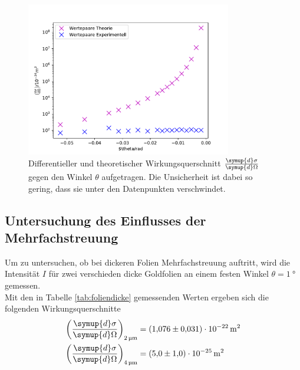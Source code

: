 \begin{figure}
    \centering
    \includegraphics[width=0.8\textwidth]{data/plots/Rutherford.pdf}
    \caption{Differentieller und theoretischer Wirkungsquerschnitt $\frac{\symup{d}\sigma}{\symup{d}\Omega}$ gegen den Winkel $\theta$ aufgetragen. Die Unsicherheit ist dabei so gering, dass sie unter den Datenpunkten verschwindet.}
    \label{fig:ruther}
\end{figure}

\FloatBarrier

\subsection{Untersuchung des Einflusses der Mehrfachstreuung}
Um zu untersuchen, ob bei dickeren Folien Mehrfachstreuung auftritt, wird die Intensität $I$ für zwei verschieden dicke Goldfolien an einem festen Winkel $\theta = \SI{1}{\degree}  $ gemessen. \\
Mit den in Tabelle \ref{tab:foliendicke} gemessenden Werten ergeben sich die folgenden Wirkungsquerschnitte
\begin{align*}
    \left(\frac{\symup{d}\sigma}{\symup{d}\Omega}\right)_\text{\SI{2}{\micro \meter}} &= \SI{1,076(31)e-22}{\meter}^2 \\
    \left(\frac{\symup{d}\sigma}{\symup{d}\Omega}\right)_\text{\SI{4}{\micro \meter}} &= \SI{5,0(10)e-25}{\meter}^2
\end{align*}

\FloatBarrier

